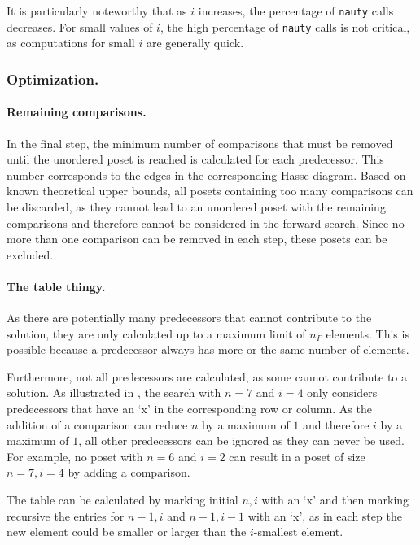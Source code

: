 \documentclass[twoside,leqno,twocolumn]{article}
\begin{document}
It is particularly noteworthy that as $i$ increases, the percentage of \texttt{nauty} calls decreases.
For small values of $i$, the high percentage of \texttt{nauty} calls is not critical, as computations for small $i$ are generally quick.

\subsubsection{Optimization.}

\paragraph{Remaining comparisons.}
In the final step, the minimum number of comparisons that must be removed until the unordered poset is reached is calculated for each predecessor.
This number corresponds to the edges in the corresponding Hasse diagram.
Based on known theoretical upper bounds, all posets containing too many comparisons can be discarded, as they cannot lead to an unordered poset with the remaining comparisons and therefore cannot be considered in the forward search.
Since no more than one comparison can be removed in each step, these posets can be excluded.

\paragraph{The table thingy.}
As there are potentially many predecessors that cannot contribute to the solution, they are only calculated up to a maximum limit of $n_P$ elements. This is possible because a predecessor always has more or the same number of elements.

Furthermore, not all predecessors are calculated, as some cannot contribute to a solution.
As illustrated in , the search with $n = 7$ and $i = 4$ only considers predecessors that have an `x' in the corresponding row or column. As the addition of a comparison can reduce $n$ by a maximum of $1$ and therefore $i$ by a maximum of $1$, all other predecessors can be ignored as they can never be used.
For example, no poset with $n = 6$ and $i = 2$ can result in a poset of size $n = 7, i = 4$ by adding a comparison.

The table can be calculated by marking initial $n, i$ with an `x' and then marking recursive the entries for $n - 1, i$ and $n - 1, i - 1$ with an `x', as in each step the new element could be smaller or larger than the $i$-smallest element.
\end{document}

